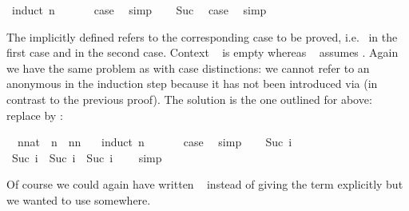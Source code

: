 \begin{isabellebody}
%
\isadelimproof
%
\endisadelimproof
%
\isatagproof
{}\isamarkupfalse%
\ {}induct\ n{}\isanewline
\ \ \isamarkupfalse%
\ {}\ \isamarkupfalse%
\ {}case\ \isamarkupfalse%
\ simp\isanewline
{}\isamarkupfalse%
\isanewline
\ \ \isamarkupfalse%
\ Suc\ \isamarkupfalse%
\ {}case\ \isamarkupfalse%
\ simp\isanewline
{}\isamarkupfalse%
%
\endisatagproof
{\isafoldproof}%
%
\isadelimproof
%
\endisadelimproof
%
\begin{isamarkuptext}%
\noindent The implicitly defined  refers to the
corresponding case to be proved, i.e.\  in the first case and
 in the second case. Context ~ is
empty whereas ~ assumes . Again we
have the same problem as with case distinctions: we cannot refer to an anonymous 
in the induction step because it has not been introduced via 
(in contrast to the previous proof). The solution is the one outlined for
 above: replace  by :%
\end{isamarkuptext}%
\isamarkuptrue%
\isamarkupfalse%
\ \ n{}{}nat\ \ {}n\ {}\ n{}n\ {}\ {}{}\isanewline
%
\isadelimproof
%
\endisadelimproof
%
\isatagproof
{}\isamarkupfalse%
\ {}induct\ n{}\isanewline
\ \ \isamarkupfalse%
\ {}\ \isamarkupfalse%
\ {}case\ \isamarkupfalse%
\ simp\isanewline
{}\isamarkupfalse%
\isanewline
\ \ \isamarkupfalse%
\ {}Suc\ i{}\ \isamarkupfalse%
\ {}Suc\ i\ {}\ Suc\ i\ {}\ Suc\ i\ {}\ {}{}\ \isamarkupfalse%
\ simp\isanewline
{}\isamarkupfalse%
%
\endisatagproof
{\isafoldproof}%
%
\isadelimproof
%
\endisadelimproof
%
\begin{isamarkuptext}%
\noindent Of course we could again have written
~ instead of giving the term explicitly
but we wanted to use  somewhere.


\end{isamarkuptext}
\end{isabellebody}
